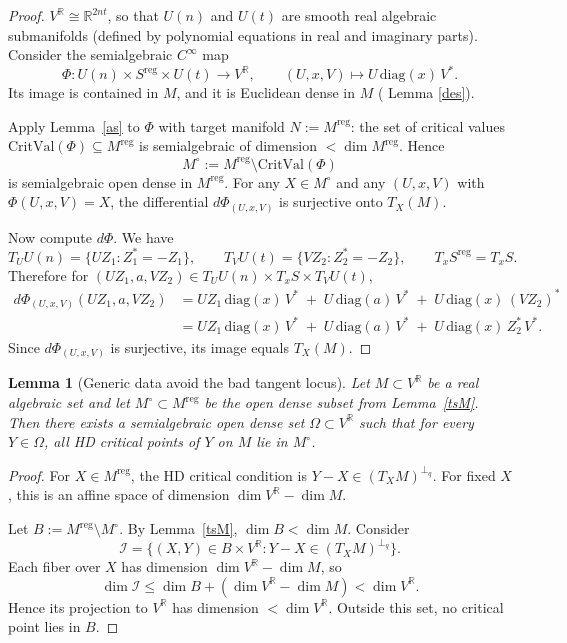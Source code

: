 \documentclass[11pt]{amsart}
\def\R{\mathbb R}\let\er\R
\theoremstyle{plain}
\newtheorem{lemma}[theorem]{Lemma}
\theoremstyle{definition}
\theoremstyle{remark}
\begin{document}
\begin{proof}
 $V^{\R}\cong \R^{2nt}$, so that $U(n)$ and $U(t)$ are smooth real algebraic
submanifolds (defined by polynomial equations in real and imaginary parts). Consider the semialgebraic
$C^\infty$ map
\[
\Phi: U(n)\times S^{\mathrm{reg}}\times U(t)\longrightarrow V^{\R},\qquad
(U,x,V)\longmapsto U\,\mathrm{diag}(x)\,V^* .
\]
Its image is contained in $M$, and it is Euclidean dense in $M$ ( Lemma \ref{des}).

Apply Lemma~\ref{as} to $\Phi$ with target manifold $N:=M^{\mathrm{reg}}$:
the set of critical values $\mathrm{CritVal}(\Phi)\subseteq M^{\mathrm{reg}}$ is semialgebraic of
dimension $<\dim M^{\mathrm{reg}}$. Hence
\[
M^\circ := M^{\mathrm{reg}}\setminus \mathrm{CritVal}(\Phi)
\]
is semialgebraic open dense in $M^{\mathrm{reg}}$. For any $X\in M^\circ$ and any $(U,x,V)$ with
$\Phi(U,x,V)=X$, the differential $d\Phi_{(U,x,V)}$ is surjective onto $T_X(M)$.

Now compute $d\Phi$. We have
\[
T_UU(n)=\{UZ_1: Z_1^*=-Z_1\},\qquad T_VU(t)=\{VZ_2: Z_2^*=-Z_2\},
\qquad T_xS^{\mathrm{reg}}=T_xS.
\]
Therefore for $(UZ_1,a,VZ_2)\in T_UU(n)\times T_xS\times T_VU(t)$,
\begin{align*}
d\Phi_{(U,x,V)}(UZ_1,a,VZ_2)
&= UZ_1\,\mathrm{diag}(x)\,V^* \;+\; U\,\mathrm{diag}(a)\,V^*
\;+\; U\,\mathrm{diag}(x)\,(VZ_2)^* \\
&= UZ_1\,\mathrm{diag}(x)\,V^* \;+\; U\,\mathrm{diag}(a)\,V^*
\;+\; U\,\mathrm{diag}(x)\,Z_2^*\,V^* .
\end{align*}
Since $d\Phi_{(U,x,V)}$ is surjective, its image equals $T_X(M)$.
\end{proof}
\begin{lemma}[Generic data avoid the bad tangent locus]\label{genericg}
Let $M \subset V^{\R}$ be a real algebraic set and let
$M^\circ \subset M^{\mathrm{reg}}$ be the open dense subset from
Lemma~\ref{tsM}. Then there exists a semialgebraic open dense set
$\Omega \subset V^{\R}$ such that for every $Y \in \Omega$,
all HD critical points of $Y$ on $M$ lie in $M^\circ$.
\end{lemma}

\begin{proof}
For $X \in M^{\mathrm{reg}}$, the HD critical condition is
$Y-X \in (T_XM)^{\perp_q}$.
For fixed $X$, this is an affine space of dimension
$\dim V^{\R}-\dim M$.

Let $B := M^{\mathrm{reg}}\setminus M^\circ$. By Lemma~\ref{tsM},
$\dim B < \dim M$. Consider
\[
\mathcal I=\{(X,Y)\in B\times V^{\R} : Y-X\in (T_XM)^{\perp_q}\}.
\]
Each fiber over $X$ has dimension $\dim V^{\R}-\dim M$, so
\[
\dim \mathcal I \le \dim B + (\dim V^{\R}-\dim M) < \dim V^{\R}.
\]
Hence its projection to $V^{\R}$ has dimension $<\dim V^{\R}$.
Outside this set, no critical point lies in $B$.
\end{proof}
\end{document}
